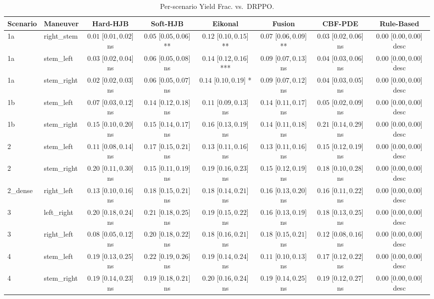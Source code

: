\begin{table}[ht]
\centering
\caption{Per-scenario Yield Frac. vs.\ DRPPO.}
\label{tab:per_scenario_action_yield_frac}
\begin{tabular}{llcccccc}
\toprule
Scenario & Maneuver & Hard-HJB & Soft-HJB & Eikonal & Fusion & CBF-PDE & Rule-Based \\
\midrule
1a & right_stem & $0.01$ [$0.01, 0.02$] ns & $0.05$ [$0.05, 0.06$] ** & $0.12$ [$0.10, 0.15$] ** & $0.07$ [$0.06, 0.09$] ** & $0.03$ [$0.02, 0.06$] ns & $0.00$ [$0.00, 0.00$] desc \\
1a & stem_left & $0.03$ [$0.02, 0.04$] ns & $0.06$ [$0.05, 0.08$] ns & $0.14$ [$0.12, 0.16$] *** & $0.09$ [$0.07, 0.13$] ns & $0.04$ [$0.03, 0.06$] ns & $0.00$ [$0.00, 0.00$] desc \\
1a & stem_right & $0.02$ [$0.02, 0.03$] ns & $0.06$ [$0.05, 0.07$] ns & $0.14$ [$0.10, 0.19$] * & $0.09$ [$0.07, 0.12$] ns & $0.04$ [$0.03, 0.05$] ns & $0.00$ [$0.00, 0.00$] desc \\
1b & stem_left & $0.07$ [$0.03, 0.12$] ns & $0.14$ [$0.12, 0.18$] ns & $0.11$ [$0.09, 0.13$] ns & $0.14$ [$0.11, 0.17$] ns & $0.05$ [$0.02, 0.09$] ns & $0.00$ [$0.00, 0.00$] desc \\
1b & stem_right & $0.15$ [$0.10, 0.20$] ns & $0.15$ [$0.14, 0.17$] ns & $0.16$ [$0.13, 0.19$] ns & $0.14$ [$0.11, 0.18$] ns & $0.21$ [$0.14, 0.29$] ns & $0.00$ [$0.00, 0.00$] desc \\
2 & stem_left & $0.11$ [$0.08, 0.14$] ns & $0.17$ [$0.15, 0.21$] ns & $0.13$ [$0.11, 0.16$] ns & $0.13$ [$0.11, 0.16$] ns & $0.15$ [$0.12, 0.19$] ns & $0.00$ [$0.00, 0.00$] desc \\
2 & stem_right & $0.20$ [$0.11, 0.30$] ns & $0.15$ [$0.11, 0.19$] ns & $0.19$ [$0.16, 0.23$] ns & $0.15$ [$0.12, 0.19$] ns & $0.18$ [$0.10, 0.28$] ns & $0.00$ [$0.00, 0.00$] desc \\
2_dense & right_left & $0.13$ [$0.10, 0.16$] ns & $0.18$ [$0.15, 0.21$] ns & $0.18$ [$0.14, 0.21$] ns & $0.16$ [$0.13, 0.20$] ns & $0.16$ [$0.11, 0.22$] ns & $0.00$ [$0.00, 0.00$] desc \\
3 & left_right & $0.20$ [$0.18, 0.24$] ns & $0.21$ [$0.18, 0.25$] ns & $0.19$ [$0.15, 0.22$] ns & $0.16$ [$0.13, 0.19$] ns & $0.18$ [$0.13, 0.25$] ns & $0.00$ [$0.00, 0.00$] desc \\
3 & right_left & $0.08$ [$0.05, 0.12$] ns & $0.20$ [$0.18, 0.22$] ns & $0.18$ [$0.16, 0.21$] ns & $0.18$ [$0.15, 0.21$] ns & $0.12$ [$0.08, 0.16$] ns & $0.00$ [$0.00, 0.00$] desc \\
4 & stem_left & $0.19$ [$0.13, 0.25$] ns & $0.22$ [$0.19, 0.26$] ns & $0.19$ [$0.14, 0.24$] ns & $0.11$ [$0.10, 0.13$] ns & $0.17$ [$0.12, 0.22$] ns & $0.00$ [$0.00, 0.00$] desc \\
4 & stem_right & $0.19$ [$0.14, 0.23$] ns & $0.19$ [$0.18, 0.21$] ns & $0.20$ [$0.16, 0.24$] ns & $0.19$ [$0.14, 0.25$] ns & $0.19$ [$0.12, 0.27$] ns & $0.00$ [$0.00, 0.00$] desc \\
\bottomrule
\end{tabular}
\end{table}
